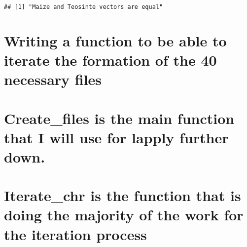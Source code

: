 \documentclass[
]{article}
\begin{document}
\begin{verbatim}
## [1] "Maize and Teosinte vectors are equal"
\end{verbatim}

\section{Writing a function to be able to iterate the formation of the
40 necessary
files}\label{writing-a-function-to-be-able-to-iterate-the-formation-of-the-40-necessary-files}

\section{Create\_files is the main function that I will use for lapply
further
down.}\label{create_files-is-the-main-function-that-i-will-use-for-lapply-further-down.}

\section{Iterate\_chr is the function that is doing the majority of the
work for the iteration
process}\label{iterate_chr-is-the-function-that-is-doing-the-majority-of-the-work-for-the-iteration-process}
\end{document}
